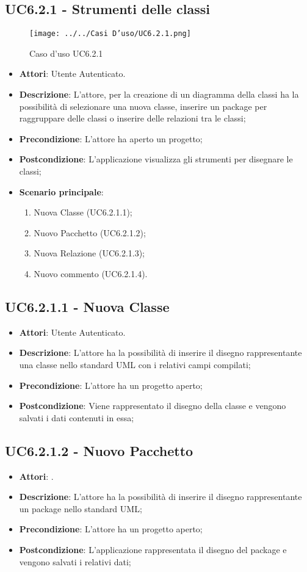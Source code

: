 \subsection{UC6.2.1 - Strumenti delle classi} 
\label{ssec:UC6.2.1}
\begin{figure}[h!] 
\centering 
\texttt{[image: ../../Casi D'uso/UC6.2.1.png]} 
\caption{Caso d'uso UC6.2.1} 
 \end{figure}  
\begin{itemize} 
\item \textbf{Attori}: Utente Autenticato.
\item \textbf{Descrizione}: L'attore, per la creazione di un diagramma della classi ha la possibilità di selezionare una nuova classe, inserire un package per raggruppare delle classi o inserire delle relazioni tra le classi;
\item \textbf{Precondizione}: L'attore ha aperto un progetto;
\item \textbf{Postcondizione}: L'applicazione visualizza gli strumenti per disegnare le classi;
\item \textbf{Scenario principale}: \begin{enumerate}\item Nuova Classe (UC6.2.1.1);\item Nuovo Pacchetto (UC6.2.1.2);\item Nuova Relazione (UC6.2.1.3);\item Nuovo commento (UC6.2.1.4). 
 \end{enumerate}
\end{itemize} 
\subsection{UC6.2.1.1 - Nuova Classe} 
\label{ssec:UC6.2.1.1} 
\begin{itemize} 
\item \textbf{Attori}: Utente Autenticato.
\item \textbf{Descrizione}: L'attore ha la possibilità di inserire il disegno rappresentante una classe nello standard UML con i relativi campi compilati;
\item \textbf{Precondizione}: L'attore ha un progetto aperto;
\item \textbf{Postcondizione}: Viene rappresentato il disegno della classe e vengono salvati i dati contenuti in essa;
\end{itemize} 
\subsection{UC6.2.1.2 - Nuovo Pacchetto} 
\label{ssec:UC6.2.1.2} 
\begin{itemize} 
\item \textbf{Attori}: .
\item \textbf{Descrizione}: L'attore ha la possibilità di inserire il disegno rappresentante un package nello standard UML;
\item \textbf{Precondizione}: L'attore ha un progetto aperto;
\item \textbf{Postcondizione}: L'applicazione rappresentata il disegno del package e vengono salvati i relativi dati;
\end{itemize} 

